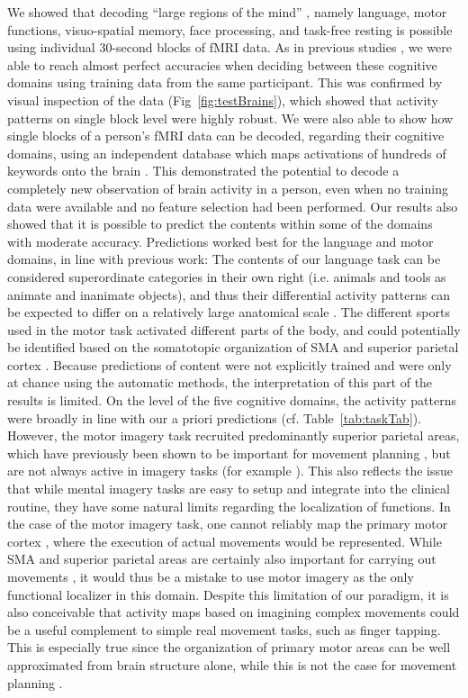 \documentclass[fleqn,10pt]{SelfArx} %
\begin{document}
We showed that decoding “large regions of the mind” \citep{Broca_1861}, namely language, motor functions, visuo-spatial memory, face processing, and task-free resting is possible using individual 30-second blocks of fMRI data. As in previous studies \citep{Boly_2007, Sorger_2012}, we were able to reach almost perfect accuracies when deciding between these cognitive domains using training data from the same participant. This was confirmed by visual inspection of the data (Fig~\ref{fig:testBrains}), which showed that activity patterns on single block level were highly robust.
We were also able to show how single blocks of a person's fMRI data can be decoded, regarding their cognitive domains, using an independent database which maps activations of hundreds of keywords onto the brain \citep{Yarkoni_2011}. This demonstrated the potential to decode a completely new observation of brain activity in a person, even when no training data were available and no feature selection had been performed.
Our results also showed that it is possible to predict the contents within some of the domains with moderate accuracy. Predictions worked best for the language and motor domains, in line with previous work: The contents of our language task can be considered superordinate categories in their own right (i.e. animals and tools as animate and inanimate objects), and thus their differential activity patterns can be expected to differ on a relatively large anatomical scale \citep{Mummery_1998}. The different sports used in the motor task activated different parts of the body, and could potentially be identified based on the somatotopic organization of SMA and superior parietal cortex \citep{Fontaine_2002, Aflalo_2015}. Because predictions of content were not explicitly trained and were only at chance using the automatic methods, the interpretation of this part of the results is limited.
On the level of the five cognitive domains, the activity patterns were broadly in line with our a priori predictions (cf. Table~\ref{tab:taskTab}). However, the motor imagery task recruited predominantly superior parietal areas, which have previously been shown to be important for movement planning \citep{Aflalo_2015}, but are not always active in imagery tasks (for example \citet{Owen_2006}). This also reflects the issue that while mental imagery tasks are easy to setup and integrate into the clinical routine, they have some natural limits regarding the localization of functions. In the case of the motor imagery task, one cannot reliably map the primary motor cortex \citep{Dechent_2004}, where the execution of actual movements would be represented. While SMA and superior parietal areas are certainly also important for carrying out movements \citep{Fontaine_2002, Aflalo_2015}, it would thus be a mistake to use motor imagery as the only functional localizer in this domain. Despite this limitation of our paradigm, it is also conceivable that activity maps based on imagining complex movements could be a useful complement to simple real movement tasks, such as finger tapping. This is especially true since the organization of primary motor areas can be well approximated from brain structure alone, while this is not the case for movement planning \citep{Aflalo_2015}.
\end{document}
